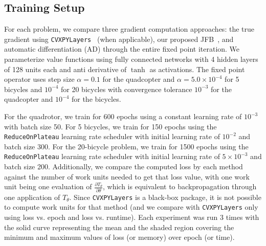 \documentclass[letterpaper, 10 pt, conference]{ieeeconf}  %
\begin{document}
    \subsection{Training Setup}
    For each problem, we compare three gradient computation approaches: the true gradient using \texttt{CVXPYLayers}~\cite{agrawal2019differentiable} (when applicable), our proposed JFB~\cite{fung2022jfb}, and automatic differentiation (AD) through the entire fixed point iteration. We parameterize value functions using fully connected networks with 4 hidden layers of 128 units each and anti derivative of $\tanh$ as activations. The fixed point operator uses step size $\alpha = 0.1$ for the quadcopter and $\alpha = 5.0 \times 10^{-4}$ for 5 bicycles and $10^{-4}$ for 20 bicycles with convergence tolerance $10^{-3}$ for the quadcopter and $10^{-4}$ for the bicycles. 

    For the quadrotor, we train for 600 epochs using a constant learning rate of $10^{-3}$ with batch size 50. For 5 bicycles, we train for 150 epochs using the \texttt{ReduceOnPlateau} learning rate scheduler with initial learning rate of $10^{-2}$ and batch size 300. For the 20-bicycle problem, we train for 1500 epochs using the \texttt{ReduceOnPlateau} learning rate scheduler with initial learning rate of $5 \times 10^{-3}$ and batch size 200. 
    Additionally, we compare the computed loss by each method against the number of work units needed to get that loss value, with one work unit being one evaluation of $\frac{\partial T_{\theta}}{\partial \theta}$, which is equivalent to backpropagation through one application of $T_\theta$. Since \texttt{CVXPYLayers} is a black-box package, it is not possible to compute work units for that method (and we compare with \texttt{CVXPYLayers} only using loss vs. epoch and loss vs. runtime). Each experiment was run 3 times with the solid curve representing the mean and the shaded region covering the minimum and maximum values of loss (or memory) over epoch (or time).
\end{document}
